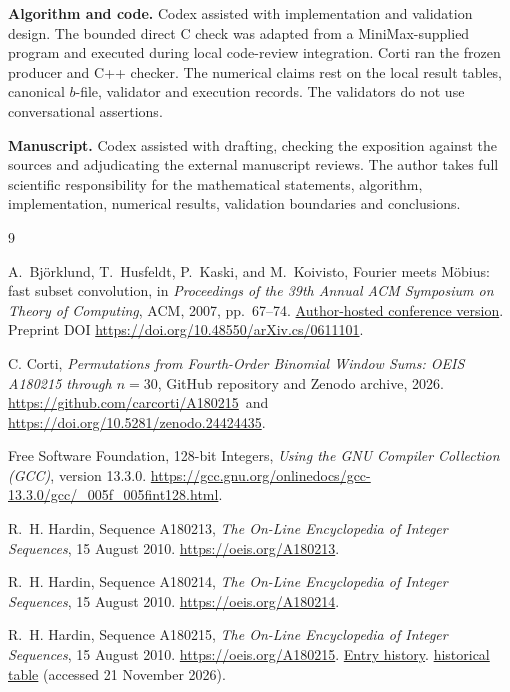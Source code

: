 \documentclass[11pt]{article}
\begin{document}
\smallskip
\noindent\textbf{Algorithm and code.}
Codex assisted with implementation and validation design.
The bounded direct C check was adapted from a MiniMax-supplied program
and executed during local code-review integration. Corti ran the frozen
producer and C++ checker.
The numerical claims rest on the local result tables, canonical
\(b\)-file, validator and execution records. The validators do not use
conversational assertions.

\smallskip
\noindent\textbf{Manuscript.}
Codex assisted with drafting, checking the exposition against the sources
and adjudicating the external manuscript reviews. The author takes full scientific
responsibility for the mathematical statements, algorithm, implementation,
numerical results, validation boundaries and conclusions.

\clearpage
\begin{thebibliography}{9}
\sloppy\raggedright
{}
A.~Bj\"orklund, T.~Husfeldt, P.~Kaski, and M.~Koivisto,
Fourier meets M\"obius: fast subset convolution,
in \emph{Proceedings of the 39th Annual ACM Symposium on Theory of Computing},
ACM, 2007, pp.~67--74.
\href{https://www.cs.helsinki.fi/u/mkhkoivi/publications/stoc-2007.pdf}{Author-hosted conference version}.
Preprint DOI \url{https://doi.org/10.48550/arXiv.cs/0611101}.

C. Corti, \emph{Permutations from Fourth-Order Binomial Window Sums:
OEIS A180215 through \(n=30\)}, GitHub repository and Zenodo archive, 2026.
\url{https://github.com/carcorti/A180215}\ and
\url{https://doi.org/10.5281/zenodo.24424435}.

Free Software Foundation, 128-bit Integers,
\emph{Using the GNU Compiler Collection (GCC)}, version 13.3.0.
\url{https://gcc.gnu.org/onlinedocs/gcc-13.3.0/gcc/_005f_005fint128.html}.

R.~H. Hardin, Sequence A180213, \emph{The On-Line Encyclopedia of
Integer Sequences}, 15 August 2010.
\url{https://oeis.org/A180213}.

R.~H. Hardin, Sequence A180214, \emph{The On-Line Encyclopedia of
Integer Sequences}, 15 August 2010.
\url{https://oeis.org/A180214}.

R.~H. Hardin, Sequence A180215, \emph{The On-Line Encyclopedia of
Integer Sequences}, 15 August 2010.
\url{https://oeis.org/A180215}.
\href{https://oeis.org/history?seq=A180215}{Entry history}.
\href{https://oeis.org/A180215/b180215.txt}{historical table}
(accessed 21 November 2026).
\end{thebibliography}
\end{document}
